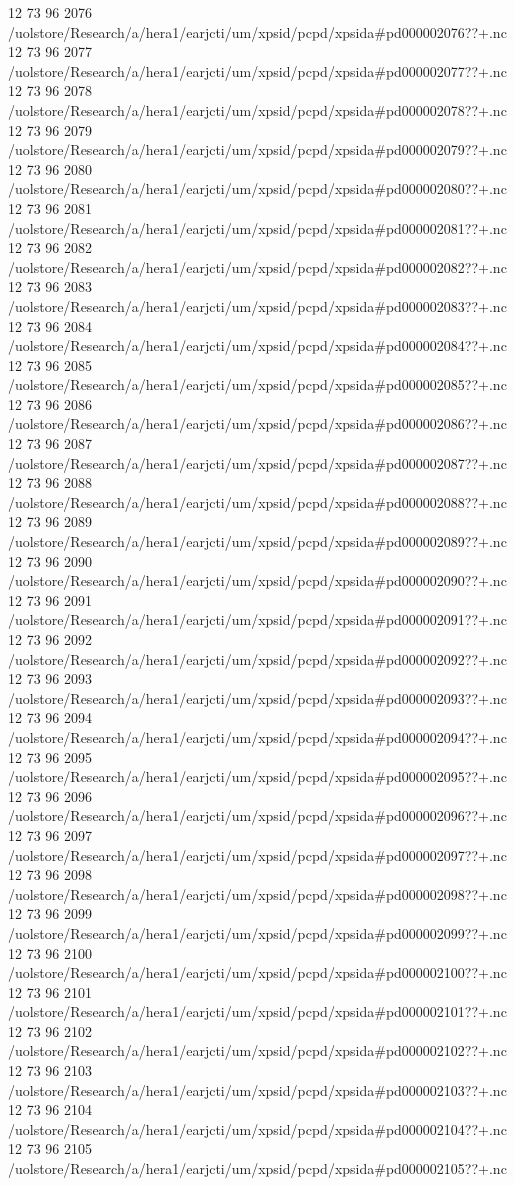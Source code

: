 12 73 96
2076
/uolstore/Research/a/hera1/earjcti/um/xpsid/pcpd/xpsida#pd000002076??+.nc
12 73 96
2077
/uolstore/Research/a/hera1/earjcti/um/xpsid/pcpd/xpsida#pd000002077??+.nc
12 73 96
2078
/uolstore/Research/a/hera1/earjcti/um/xpsid/pcpd/xpsida#pd000002078??+.nc
12 73 96
2079
/uolstore/Research/a/hera1/earjcti/um/xpsid/pcpd/xpsida#pd000002079??+.nc
12 73 96
2080
/uolstore/Research/a/hera1/earjcti/um/xpsid/pcpd/xpsida#pd000002080??+.nc
12 73 96
2081
/uolstore/Research/a/hera1/earjcti/um/xpsid/pcpd/xpsida#pd000002081??+.nc
12 73 96
2082
/uolstore/Research/a/hera1/earjcti/um/xpsid/pcpd/xpsida#pd000002082??+.nc
12 73 96
2083
/uolstore/Research/a/hera1/earjcti/um/xpsid/pcpd/xpsida#pd000002083??+.nc
12 73 96
2084
/uolstore/Research/a/hera1/earjcti/um/xpsid/pcpd/xpsida#pd000002084??+.nc
12 73 96
2085
/uolstore/Research/a/hera1/earjcti/um/xpsid/pcpd/xpsida#pd000002085??+.nc
12 73 96
2086
/uolstore/Research/a/hera1/earjcti/um/xpsid/pcpd/xpsida#pd000002086??+.nc
12 73 96
2087
/uolstore/Research/a/hera1/earjcti/um/xpsid/pcpd/xpsida#pd000002087??+.nc
12 73 96
2088
/uolstore/Research/a/hera1/earjcti/um/xpsid/pcpd/xpsida#pd000002088??+.nc
12 73 96
2089
/uolstore/Research/a/hera1/earjcti/um/xpsid/pcpd/xpsida#pd000002089??+.nc
12 73 96
2090
/uolstore/Research/a/hera1/earjcti/um/xpsid/pcpd/xpsida#pd000002090??+.nc
12 73 96
2091
/uolstore/Research/a/hera1/earjcti/um/xpsid/pcpd/xpsida#pd000002091??+.nc
12 73 96
2092
/uolstore/Research/a/hera1/earjcti/um/xpsid/pcpd/xpsida#pd000002092??+.nc
12 73 96
2093
/uolstore/Research/a/hera1/earjcti/um/xpsid/pcpd/xpsida#pd000002093??+.nc
12 73 96
2094
/uolstore/Research/a/hera1/earjcti/um/xpsid/pcpd/xpsida#pd000002094??+.nc
12 73 96
2095
/uolstore/Research/a/hera1/earjcti/um/xpsid/pcpd/xpsida#pd000002095??+.nc
12 73 96
2096
/uolstore/Research/a/hera1/earjcti/um/xpsid/pcpd/xpsida#pd000002096??+.nc
12 73 96
2097
/uolstore/Research/a/hera1/earjcti/um/xpsid/pcpd/xpsida#pd000002097??+.nc
12 73 96
2098
/uolstore/Research/a/hera1/earjcti/um/xpsid/pcpd/xpsida#pd000002098??+.nc
12 73 96
2099
/uolstore/Research/a/hera1/earjcti/um/xpsid/pcpd/xpsida#pd000002099??+.nc
12 73 96
2100
/uolstore/Research/a/hera1/earjcti/um/xpsid/pcpd/xpsida#pd000002100??+.nc
12 73 96
2101
/uolstore/Research/a/hera1/earjcti/um/xpsid/pcpd/xpsida#pd000002101??+.nc
12 73 96
2102
/uolstore/Research/a/hera1/earjcti/um/xpsid/pcpd/xpsida#pd000002102??+.nc
12 73 96
2103
/uolstore/Research/a/hera1/earjcti/um/xpsid/pcpd/xpsida#pd000002103??+.nc
12 73 96
2104
/uolstore/Research/a/hera1/earjcti/um/xpsid/pcpd/xpsida#pd000002104??+.nc
12 73 96
2105
/uolstore/Research/a/hera1/earjcti/um/xpsid/pcpd/xpsida#pd000002105??+.nc
